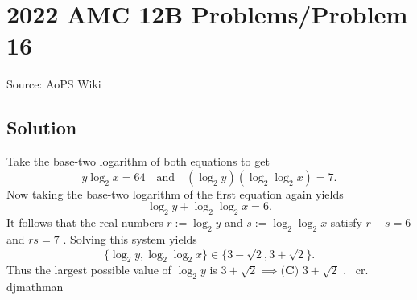 \documentclass[12pt]{article}
\begin{document}
\section*{{2022 AMC 12B Problems/Problem 16}}
Source: AoPS Wiki

\subsection*{Solution}
Take the base-two logarithm of both equations to get \[y\log_2 x = 64\quad\text{and}\quad (\log_2 y)(\log_2\log_2 x) = 7.\] Now taking the base-two logarithm of the first equation again yields \[\log_2 y + \log_2\log_2 x = 6.\] It follows that the real numbers $r:=\log_2 y$ and $s:=\log_2\log_2 x$ satisfy $r+s=6$ and $rs = 7$ . Solving this system yields \[\{\log_2 y,\log_2\log_2 x\}\in\{3-\sqrt 2, 3 + \sqrt 2\}.\] Thus the largest possible value of $\log_2 y$ is $3+\sqrt 2 \implies \boxed{\textbf{(C) }3+\sqrt{2}}$ . ~cr. djmathman
\end{document}

